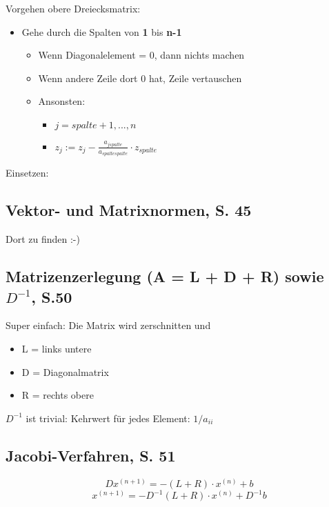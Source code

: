 Vorgehen obere Dreiecksmatrix:
\begin{itemize}
\item Gehe durch die Spalten von \textbf{1} bis \textbf{n-1}
\begin{itemize}
\item Wenn Diagonalelement = 0, dann nichts machen
\item Wenn andere Zeile dort 0 hat, Zeile vertauschen
\item Ansonsten:
\begin{itemize}
\item $j = spalte + 1, ..., n$
\item $z_j := z_j - \frac{a_{jspalte}}{a_{spaltespalte}} \cdot z_{spalte}$
\end{itemize}
\end{itemize}
\end{itemize}
Einsetzen:

\subsection{Vektor- und Matrixnormen, S. 45}
Dort zu finden :-)

\subsection{Matrizenzerlegung (A = L + D + R) sowie $D^{-1}$, S.50}
Super einfach: Die Matrix wird zerschnitten und
\begin{itemize}
\item L = links untere
\item D = Diagonalmatrix
\item R = rechts obere
\end{itemize}

$D^{-1}$ ist trivial: Kehrwert für jedes Element: $1/a_{ii}$

\subsection{Jacobi-Verfahren, S. 51}

\[D{x^{(n+1)}} = - (L+R) \cdot x^{(n)} + b\]
\[{x^{(n+1)}} = -D^{-1} (L+R) \cdot x^{(n)} + D^{-1} b\]
